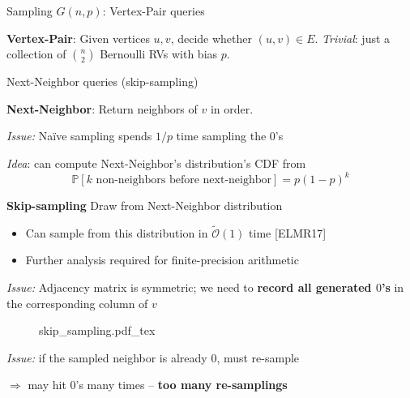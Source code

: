 \begin{block}{Sampling $G(n, p)$: \textsf{Vertex-Pair} queries}


\textbf{\textsf{Vertex-Pair}}: Given vertices $u, v$, decide whether $(u,v)\in E$.
    \emph{Trivial}: just a collection of $n \choose 2$ Bernoulli RVs with bias $p$.

\end{block}

\begin{block}{\textsf{Next-Neighbor} queries (skip-sampling)}

\textbf{\textsf{Next-Neighbor}}: Return neighbors of $v$ in order.

\vspace{15pt}

\emph{\color{red}Issue:} Na\"ive sampling spends $1/p$ time sampling the $0$'s

\emph{Idea}: can compute \textsf{Next-Neighbor}'s distribution's CDF from
\vspace{-10pt}
\[ \mathbb P[k \textrm{ non-neighbors before next-neighbor}] = p(1-p)^k \]

\colorbox{BlueGreen}{\textbf{Skip-sampling}} Draw from \textsf{Next-Neighbor} distribution
\vspace{-20pt}
\begin{itemize}
    \item Can sample from this distribution in $\tilde{\mathcal O}(1)$ time [ELMR17]
    \item Further analysis required for finite-precision arithmetic
\end{itemize}

\emph{\color{red}Issue:} Adjacency matrix is symmetric; we need to \textbf{record all generated $0$'s} in the corresponding column of $v$

\begin{figure}[h!]\centering
    \def\svgwidth{0.9\columnwidth}
    {skip_sampling.pdf_tex}
\end{figure}
\emph{\color{red}Issue:} if the sampled neighbor is already $0$, must re-sample

\quad$\Rightarrow$ may hit $0$'s many times -- \textbf{too many re-samplings}

\end{block}
